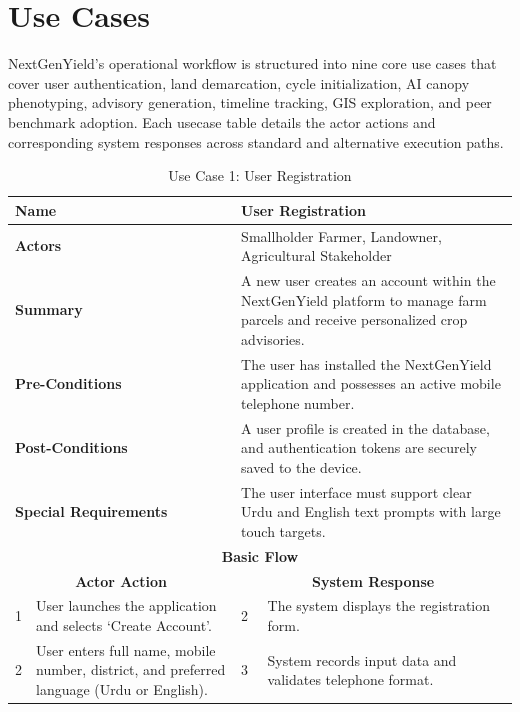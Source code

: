 \section{Use Cases}
NextGenYield's operational workflow is structured into nine core use cases that cover user authentication, land demarcation, cycle initialization, AI canopy phenotyping, advisory generation, timeline tracking, GIS exploration, and peer benchmark adoption. Each usecase table details the actor actions and corresponding system responses across standard and alternative execution paths.

\begin{table}[H]
\small
\centering
\caption{Use Case 1: User Registration}
\label{tab:uc1}
\begin{tabular}{|p{0.6cm}|p{6.4cm}|p{0.8cm}|p{6.6cm}|}
\hline
\multicolumn{2}{|p{7.0cm}|}{\textbf{Name}} & \multicolumn{2}{p{7.4cm}|}{User Registration} \\ \hline
\multicolumn{2}{|p{7.0cm}|}{\textbf{Actors}} & \multicolumn{2}{p{7.4cm}|}{Smallholder Farmer, Landowner, Agricultural Stakeholder} \\ \hline
\multicolumn{2}{|p{7.0cm}|}{\textbf{Summary}} & \multicolumn{2}{p{7.4cm}|}{A new user creates an account within the NextGenYield platform to manage farm parcels and receive personalized crop advisories.} \\ \hline
\multicolumn{2}{|p{7.0cm}|}{\textbf{Pre-Conditions}} & \multicolumn{2}{p{7.4cm}|}{The user has installed the NextGenYield application and possesses an active mobile telephone number.} \\ \hline
\multicolumn{2}{|p{7.0cm}|}{\textbf{Post-Conditions}} & \multicolumn{2}{p{7.4cm}|}{A user profile is created in the database, and authentication tokens are securely saved to the device.} \\ \hline
\multicolumn{2}{|p{7.0cm}|}{\textbf{Special Requirements}} & \multicolumn{2}{p{7.4cm}|}{The user interface must support clear Urdu and English text prompts with large touch targets.} \\ \hline
\multicolumn{4}{|c|}{\textbf{Basic Flow}} \\ \hline
\multicolumn{2}{|c|}{\textbf{Actor Action}} & \multicolumn{2}{c|}{\textbf{System Response}} \\ \hline
1 & User launches the application and selects `Create Account'. & 2 & The system displays the registration form. \\ \hline
2 & User enters full name, mobile number, district, and preferred language (Urdu or English). & 3 & System records input data and validates telephone format. \\ \hline

\end{tabular}
\end{table}
